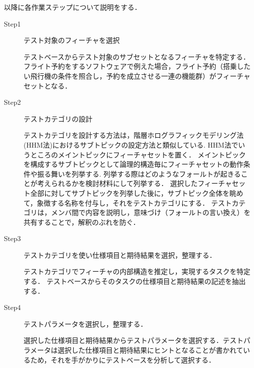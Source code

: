 以降に各作業ステップについて説明をする．

\begin{description}
\item[Step1] テスト対象のフィーチャを選択

テストベースからテスト対象のサブセットとなるフィーチャを特定する．フライト予約をするソフトウェアで例えた場合，フライト予約（搭乗したい飛行機の条件を照合し，予約を成立させる一連の機能群）がフィーチャセットとなる．

\item[Step2] テストカテゴリの設計

テストカテゴリを設計する方法は，階層ホログラフィックモデリング法(HHM法)におけるサブトピックの設定方法と類似している\cite{HHM2002}.
HHM法でいうところのメイントピックにフィーチャセットを置く．
メイントピックを構成するサブトピックとして論理的構造毎にフィーチャセットの動作条件や振る舞いを列挙する.
列挙する際はどのようなフォールトが起きることが考えられるかを検討材料にして列挙する．
選択したフィーチャセット全部に対してサブトピックを列挙した後に，サブトピック全体を眺めて，象徴する名称を付与し，それをテストカテゴリにする．
テストカテゴリは，メンバ間で内容を説明し，意味づけ（フォールトの言い換え）を共有することで，解釈のぶれを防ぐ．


\item[Step3] テストカテゴリを使い仕様項目と期待結果を選択，整理する．

テストカテゴリでフィーチャの内部構造を推定し，実現するタスクを特定する．
テストベースからそのタスクの仕様項目と期待結果の記述を抽出する．


\item[Step4] テストパラメータを選択し，整理する．

選択した仕様項目と期待結果からテストパラメータを選択する．テストパラメータは選択した仕様項目と期待結果にヒントとなることが書かれているため，それを手がかりにテストベースを分析して選択する．

\end{description}




